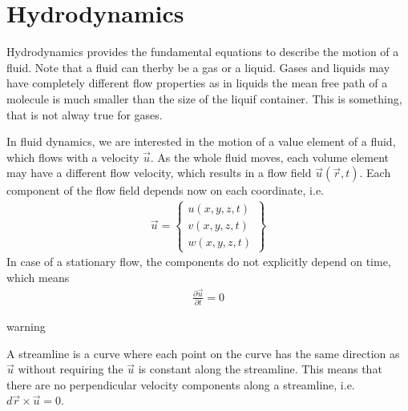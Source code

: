 \documentclass[letterpaper,10pt,english]{sphinxmanual}
\let\sphinxpxdimen\pdfpxdimen\else\newdimen\sphinxpxdimen
\begin{document}
\chapter{Hydrodynamics}
\label{\detokenize{notebooks/L17/1_hydrodynamics:Hydrodynamics}}\label{\detokenize{notebooks/L17/1_hydrodynamics::doc}}
\sphinxAtStartPar
Hydrodynamics provides the fundamental equations to describe the motion of a fluid. Note that a fluid can therby be a gas or a liquid. Gases and liquids may have completely different flow properties as in liquids the mean free path of a molecule is much smaller than the size of the liquif container. This is something, that is not alway true for gases.

\sphinxAtStartPar
In fluid dynamics, we are interested in the motion of a value element of a fluid, which flows with a velocity \(\vec{u}\). As the whole fluid moves, each volume element may have a different flow velocity, which results in a flow field \(\vec{u}(\vec{r},t)\). Each component of the flow field depends now on each coordinate, i.e.
\begin{equation*}
\begin{split}\vec{u}=
\begin{Bmatrix}
u(x,y,z,t)\\
v(x,y,z,t)\\
w(x,y,z,t)
\end{Bmatrix}\end{split}
\end{equation*}
\sphinxAtStartPar
In case of a stationary flow, the components do not explicitly depend on time, which means
\begin{equation*}
\begin{split}\frac{\partial \vec{u}}{\partial t}=0\end{split}
\end{equation*}
\begin{sphinxadmonition}{warning}{}\unskip
\sphinxAtStartPar
{}

\sphinxAtStartPar
A streamline is a curve where each point on the curve has the same direction as \(\vec{u}\) without requiring the \(\vec{u}\) is constant along the streamline. This means that there are no perpendicular velocity components along a streamline, i.e. \(d\vec{r}\times \vec{u}=0\).

\sphinxAtStartPar
\sphinxincludegraphics[width=1536\sphinxpxdimen,height=468\sphinxpxdimen]{{stream}.png}
\end{sphinxadmonition}
\end{document}
